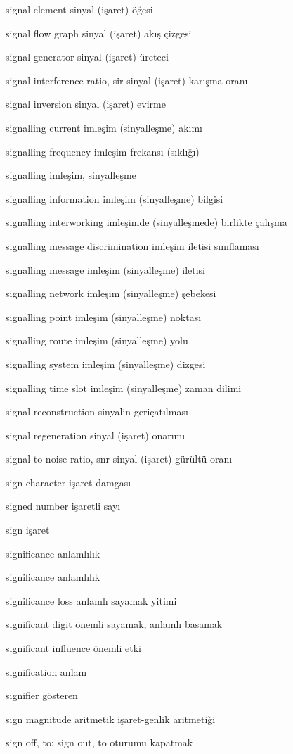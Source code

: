 \documentclass[12pt,fleqn]{article}\usepackage{../../common}
\begin{document}
signal element sinyal (işaret) öğesi

signal flow graph sinyal (işaret) akış çizgesi

signal generator sinyal (işaret) üreteci

signal interference ratio, sir sinyal (işaret) karışma oranı

signal inversion sinyal (işaret) evirme

signalling current imleşim (sinyalleşme) akımı

signalling frequency imleşim frekansı (sıklığı)

signalling imleşim, sinyalleşme

signalling information imleşim (sinyalleşme) bilgisi

signalling interworking imleşimde (sinyalleşmede) birlikte çalışma

signalling message discrimination imleşim iletisi sınıflaması

signalling message imleşim (sinyalleşme) iletisi

signalling network imleşim (sinyalleşme) şebekesi

signalling point imleşim (sinyalleşme) noktası

signalling route imleşim (sinyalleşme) yolu

signalling system imleşim (sinyalleşme) dizgesi

signalling time slot imleşim (sinyalleşme) zaman dilimi

signal reconstruction sinyalin geriçatılması

signal regeneration sinyal (işaret) onarımı

signal to noise ratio, snr sinyal (işaret) gürültü oranı

sign character işaret damgası

signed number işaretli sayı

sign işaret

significance anlamlılık

significance anlamlılık

significance loss anlamlı sayamak yitimi

significant digit önemli sayamak, anlamlı basamak

significant influence önemli etki

signification anlam

signifier gösteren

sign magnitude aritmetik işaret-genlik aritmetiği

sign off, to; sign out, to oturumu kapatmak
\end{document}
